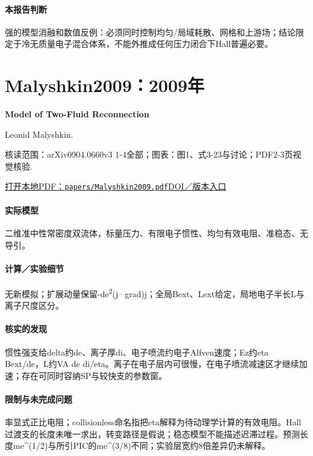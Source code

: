\paragraph{本报告判断}强的模型消融和数值反例：必须同时控制均匀/局域耗散、网格和上游场；结论限定于冷无质量电子混合体系，不能外推成任何压力闭合下Hall普遍必要。

\section{Malyshkin2009：2009年}\label{paper:Malyshkin2009}

\textbf{Model of Two-Fluid Reconnection}\citep{Malyshkin2009}\

Leonid Malyshkin.

\textsf{核读范围：}arXiv0904.0660v3 1-4全部；\textsf{图表：}图1、式3-23与讨论；PDF2-3页视觉核验.

\href{run:papers/Malyshkin2009.pdf}{打开本地PDF：\texttt{papers/Malyshkin2009.pdf}}\quad\href{https://doi.org/10.1103/physrevlett.103.235004}{DOI／版本入口}

\paragraph{实际模型}二维准中性常密度双流体，标量压力、有限电子惯性、均匀有效电阻、准稳态、无导引。

\paragraph{计算／实验细节}无新模拟；扩展动量保留-de\textsuperscript{2}(j·grad)j；全局Bext、Lext给定，局地电子半长L与离子尺度区分。

\paragraph{核实的发现}惯性强支给delta约de、离子厚di、电子喷流约电子Alfven速度；Ez约eta Bext/de，L约VA de di/eta。离子在电子层内可很慢，在电子喷流减速区才继续加速；存在可同时容纳SP与较快支的参数窗。

\paragraph{限制与未完成问题}率显式正比电阻；collisionless命名指把eta解释为待动理学计算的有效电阻。Hall过渡支的长度未唯一求出，转变路径是假说；稳态模型不能描述迟滞过程。预测长度me\textasciicircum{}(1/2)与所引PIC的me\textasciicircum{}(3/8)不同；实验层宽约8倍差异仍未解释。

